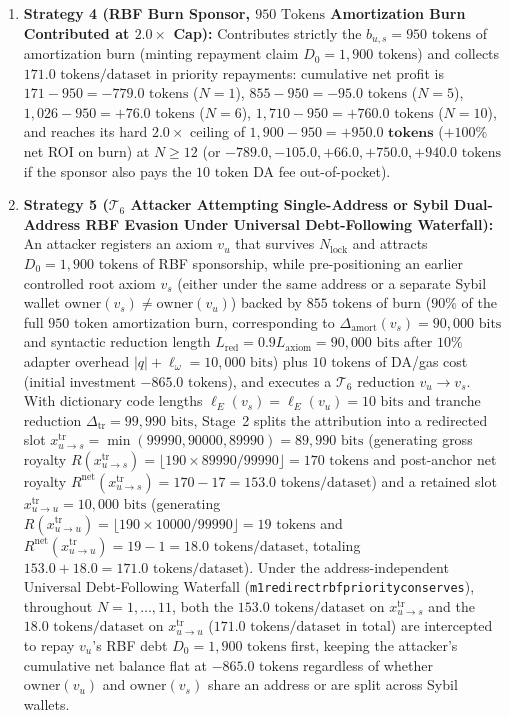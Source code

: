 \documentclass[runningheads,a4paper]{llncs}
\renewcommand{\_}{\textunderscore\allowbreak}
\begin{document}
\begin{enumerate}
  \item \textbf{Strategy 4 (RBF Burn Sponsor, $950\text{ Tokens}$ Amortization Burn Contributed at $2.0\times$ Cap):} Contributes strictly the $b_{u,s} = 950\text{ tokens}$ of amortization burn (minting repayment claim $D_0 = 1,900\text{ tokens}$) and collects $171.0\text{ tokens/dataset}$ in priority repayments: cumulative net profit is $171 - 950 = -779.0\text{ tokens}$ ($N=1$), $855 - 950 = -95.0\text{ tokens}$ ($N=5$), $1,026 - 950 = +76.0\text{ tokens}$ ($N=6$), $1,710 - 950 = +760.0\text{ tokens}$ ($N=10$), and reaches its hard $2.0\times$ ceiling of $1,900 - 950 = \mathbf{+950.0\text{ tokens}}$ ($+100\%$ net ROI on burn) at $N \ge 12$ (or $-789.0,\allowbreak -105.0,\allowbreak +66.0,\allowbreak +750.0,\allowbreak +940.0\text{ tokens}$ if the sponsor also pays the $10\text{ token}$ DA fee out-of-pocket).
  \item \textbf{Strategy 5 ($\mathcal{T}_6$ Attacker Attempting Single-Address or Sybil Dual-Address RBF Evasion Under Universal Debt-Following Waterfall):} An attacker registers an axiom $v_u$ that survives $N_{\text{lock}}$ and attracts $D_0 = 1,900\text{ tokens}$ of RBF sponsorship, while pre-positioning an earlier controlled root axiom $v_s$ (either under the same address or a separate Sybil wallet $\text{owner}(v_s) \neq \text{owner}(v_u)$) backed by $855\text{ tokens}$ of burn ($90\%$ of the full $950\text{ token}$ amortization burn, corresponding to $\Delta_{\text{amort}}(v_s) = 90,000\text{ bits}$ and syntactic reduction length $L_{\text{red}} = 0.9 L_{\text{axiom}} = 90,000\text{ bits}$ after $10\%$ adapter overhead $|q| + \ell_\omega = 10,000\text{ bits}$) plus $10\text{ tokens}$ of DA/gas cost (initial investment $-865.0\text{ tokens}$), and executes a $\mathcal{T}_6$ reduction $v_u \to v_s$. With dictionary code lengths $\ell_E(v_s) = \ell_E(v_u) = 10\text{ bits}$ and tranche reduction $\Delta_{\text{tr}} = 99,990\text{ bits}$, Stage~2 splits the attribution into a redirected slot $x_{u \to s}^{\text{tr}} = \min(99990,\allowbreak 90000,\allowbreak 89990) = 89,990\text{ bits}$ (generating gross royalty $R(x_{u \to s}^{\text{tr}}) = \lfloor 190 \times 89990 / 99990 \rfloor = 170\text{ tokens}$ and post-anchor net royalty $R^{\text{net}}(x_{u \to s}^{\text{tr}}) = 170 - 17 = 153.0\text{ tokens/dataset}$) and a retained slot $x_{u \to u}^{\text{tr}} = 10,000\text{ bits}$ (generating $R(x_{u \to u}^{\text{tr}}) = \lfloor 190 \times 10000 / 99990 \rfloor = 19\text{ tokens}$ and $R^{\text{net}}(x_{u \to u}^{\text{tr}}) = 19 - 1 = 18.0\text{ tokens/dataset}$, totaling $153.0 + 18.0 = 171.0\text{ tokens/dataset}$). Under the address-independent Universal Debt-Following Waterfall (\texttt{m1\_redirect\_rbf\_priority\_conserves}), throughout $N = 1,\allowbreak \dots,\allowbreak 11$, both the $153.0\text{ tokens/dataset}$ on $x_{u \to s}^{\text{tr}}$ and the $18.0\text{ tokens/dataset}$ on $x_{u \to u}^{\text{tr}}$ ($171.0\text{ tokens/dataset}$ in total) are intercepted to repay $v_u$'s RBF debt $D_0 = 1,900\text{ tokens}$ first, keeping the attacker's cumulative net balance flat at $-865.0\text{ tokens}$ regardless of whether $\text{owner}(v_u)$ and $\text{owner}(v_s)$ share an address or are split across Sybil wallets. 
\end{enumerate}
\end{document}
